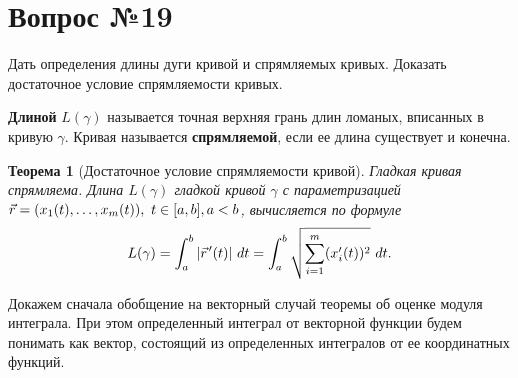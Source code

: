 \documentclass[12pt]{report}
\numberwithin{equation}{section}
\newtheorem{theorem}{Теорема}[section]
\newcommand{\pvec}[1]{\vec{#1}\mkern2mu\vphantom{#1}}
\begin{document}
\newpage \section{Вопрос №19} %
\begin{framed}
Дать определения длины дуги кривой и спрямляемых кривых. Доказать достаточное условие спрямляемости кривых.
\end{framed}

\textbf{Длиной} $L(\gamma)$ называется точная верхняя грань длин ломаных, вписанных в кривую $\gamma$. Кривая называется \textbf{спрямляемой}, если ее длина существует и конечна.

\begin{theorem}[Достаточное условие спрямляемости кривой] \label{th:19:1}
Гладкая кривая спрямляема. Длина $L(\gamma)$ гладкой кривой $\gamma$ с параметризацией $\vec{r} = (x_1(t),\ldots,x_m(t)),~t\in[a,b],\\a < b$, вычисляется по формуле
\[ L(\gamma) = \int_a^b |\pvec{r}'(t)|~dt = \int_a^b \sqrt{\sum_{i=1}^m (x_i'(t))^2}~dt.\]
\end{theorem}

Докажем сначала обобщение на векторный случай теоремы об оценке модуля интеграла. При этом определенный интеграл от векторной функции будем понимать как вектор, состоящий из определенных интегралов от ее координатных функций.
\end{document}
